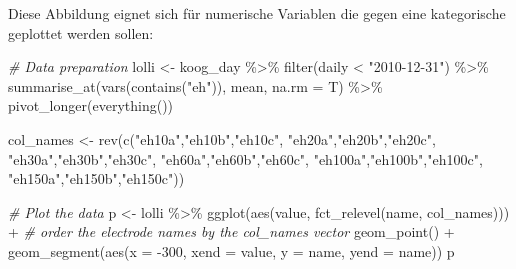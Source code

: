 \documentclass[
]{article}
\newenvironment{Shaded}{\begin{snugshade}}{\end{snugshade}}
\newcommand{\AttributeTok}[1]{\textcolor[rgb]{0.77,0.63,0.00}{#1}}
\newcommand{\CommentTok}[1]{\textcolor[rgb]{0.56,0.35,0.01}{\textit{#1}}}
\newcommand{\DecValTok}[1]{\textcolor[rgb]{0.00,0.00,0.81}{#1}}
\newcommand{\FunctionTok}[1]{\textcolor[rgb]{0.00,0.00,0.00}{#1}}
\newcommand{\NormalTok}[1]{#1}
\newcommand{\OtherTok}[1]{\textcolor[rgb]{0.56,0.35,0.01}{#1}}
\newcommand{\SpecialCharTok}[1]{\textcolor[rgb]{0.00,0.00,0.00}{#1}}
\newcommand{\StringTok}[1]{\textcolor[rgb]{0.31,0.60,0.02}{#1}}
\begin{document}
Diese Abbildung eignet sich für numerische Variablen die gegen eine kategorische geplottet werden sollen:

\begin{Shaded}
\begin{Highlighting}[]
\CommentTok{\# Data preparation}
\NormalTok{lolli }\OtherTok{\textless{}{-}}\NormalTok{ koog\_day }\SpecialCharTok{\%\textgreater{}\%}
  \FunctionTok{filter}\NormalTok{(daily }\SpecialCharTok{\textless{}} \StringTok{"2010{-}12{-}31"}\NormalTok{) }\SpecialCharTok{\%\textgreater{}\%}
  \FunctionTok{summarise\_at}\NormalTok{(}\FunctionTok{vars}\NormalTok{(}\FunctionTok{contains}\NormalTok{(}\StringTok{"eh"}\NormalTok{)), mean, }\AttributeTok{na.rm =}\NormalTok{ T) }\SpecialCharTok{\%\textgreater{}\%}
  \FunctionTok{pivot\_longer}\NormalTok{(}\FunctionTok{everything}\NormalTok{())}

\NormalTok{col\_names }\OtherTok{\textless{}{-}} \FunctionTok{rev}\NormalTok{(}\FunctionTok{c}\NormalTok{(}\StringTok{"eh10a"}\NormalTok{,}\StringTok{"eh10b"}\NormalTok{,}\StringTok{"eh10c"}\NormalTok{,}
                   \StringTok{"eh20a"}\NormalTok{,}\StringTok{"eh20b"}\NormalTok{,}\StringTok{"eh20c"}\NormalTok{,}
                   \StringTok{"eh30a"}\NormalTok{,}\StringTok{"eh30b"}\NormalTok{,}\StringTok{"eh30c"}\NormalTok{,}
                                           \StringTok{"eh60a"}\NormalTok{,}\StringTok{"eh60b"}\NormalTok{,}\StringTok{"eh60c"}\NormalTok{,}
                                           \StringTok{"eh100a"}\NormalTok{,}\StringTok{"eh100b"}\NormalTok{,}\StringTok{"eh100c"}\NormalTok{,}
                                           \StringTok{"eh150a"}\NormalTok{,}\StringTok{"eh150b"}\NormalTok{,}\StringTok{"eh150c"}\NormalTok{))}
  


\CommentTok{\# Plot the data}
\NormalTok{p }\OtherTok{\textless{}{-}}\NormalTok{ lolli }\SpecialCharTok{\%\textgreater{}\%}
  \FunctionTok{ggplot}\NormalTok{(}\FunctionTok{aes}\NormalTok{(value, }\FunctionTok{fct\_relevel}\NormalTok{(name, col\_names))) }\SpecialCharTok{+} \CommentTok{\# order the electrode names by the col\_names vector}
  \FunctionTok{geom\_point}\NormalTok{() }\SpecialCharTok{+}
  \FunctionTok{geom\_segment}\NormalTok{(}\FunctionTok{aes}\NormalTok{(}\AttributeTok{x =} \SpecialCharTok{{-}}\DecValTok{300}\NormalTok{, }\AttributeTok{xend =}\NormalTok{ value, }\AttributeTok{y =}\NormalTok{ name, }\AttributeTok{yend =}\NormalTok{ name))}
\NormalTok{p}
\end{Highlighting}
\end{Shaded}
\end{document}
